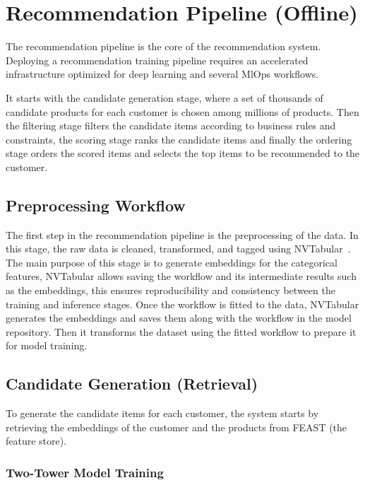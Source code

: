 
\section{Recommendation Pipeline (Offline)}

The recommendation pipeline is the core of the recommendation system.
Deploying a recommendation training pipeline requires an accelerated infrastructure optimized for deep learning and several MlOps workflows.

It starts with the candidate generation stage, where a set of thousands of candidate products for each customer is chosen among millions of products.
Then the filtering stage filters the candidate items according to business rules and constraints, the scoring stage ranks the candidate items and finally the ordering stage orders 
the scored items and selects the top items to be recommended to the customer.

\subsection{Preprocessing Workflow}

The first step in the recommendation pipeline is the preprocessing of the data. 
In this stage, the raw data is cleaned, transformed, and tagged using NVTabular~\cite{MerlinNVTabular}.
The main purpose of this stage is to generate embeddings for the categorical features,
NVTabular allows saving the workflow and its intermediate results such as the embeddings, this ensures reproducibility and consistency between the training and inference stages.
Once the workflow is fitted to the data, NVTabular generates the embeddings and saves them along with the workflow in the model repository.
Then it transforms the dataset using the fitted workflow to prepare it for model training.


\subsection{Candidate Generation (Retrieval)}

To generate the candidate items for each customer, the system starts by retrieving the embeddings of the customer and the products from FEAST (the feature store).

\subsubsection{Two-Tower Model Training}

